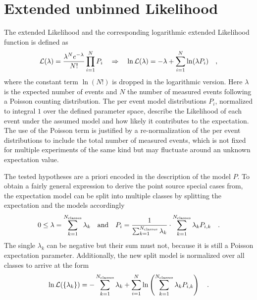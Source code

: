 \section{Extended unbinned Likelihood}
The extended Likelihood \cite{barlow1989statistics} and the corresponding logarithmic extended Likelihood function is defined as
\begin{equation}
  \mathcal{L}(\lambda) = \frac{\lambda^N e^{-\lambda}}{N!}\prod_{i=1}^N P_i
  \quad\Rightarrow\quad
    \ln\mathcal{L}(\lambda) = -\lambda+\sum_{i=1}^N \ln(\lambda P_i)
  \quad\text{,}
\end{equation}
where the constant term $\ln(N!)$ is dropped in the logarithmic version.
Here $\lambda$ is the expected number of events and $N$ the number of measured events following a Poisson counting distribution.
The per event model distributions $P_i$, normalized to integral $1$ over the defined parameter space, describe the Likelihood of each event under the assumed model and how likely it contributes to the expectation.
The use of the Poisson term is justified by a re-normalization of the per event distributions to include the total number of measured events, which is not fixed for multiple experiments of the same kind but may fluctuate around an unknown expectation value.

The tested hypotheses are a priori encoded in the description of the model $P$.
To obtain a fairly general expression to derive the point source special cases from, the expectation model can be split into multiple classes by splitting the expectation and the models accordingly
\begin{equation}
  0 \leq \lambda = \sum_{k=1}^{N_\text{classes}} \lambda_k
  \quad\text{and}\quad
  P_i = \frac{1}{\sum_{k=1}^{N_\text{classes}} \lambda_k}\cdot
         \sum_{k=1}^{N_\text{classes}} \lambda_k P_{i,k}
  \quad\text{.}
\end{equation}
The single $\lambda_k$ can be negative but their sum must not, because it is still a Poisson expectation parameter.
Additionally, the new split model is normalized over all classes to arrive at the form
\begin{equation}
  \label{equ:extended_llh}
  \ln\mathcal{L}(\{\lambda_k\})
  = -\sum_{k=1}^{N_\text{classes}} \lambda_k +
    \sum_{i=1}^N \ln\left(\sum_{k=1}^{N_\text{classes}}
      \lambda_k P_{i,k} \right)
  \quad\text{.}
\end{equation}

